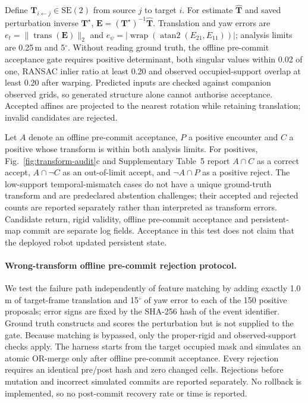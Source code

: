 \documentclass[11pt]{article}
\begin{document}
Define $\mathbf{T}_{i\leftarrow j}\in\mathrm{SE}(2)$ from source $j$ to target $i$. For estimate $\widehat{\mathbf T}$ and saved perturbation inverse $\mathbf T^{\star}$, $\mathbf E=(\mathbf T^{\star})^{-1}\widehat{\mathbf T}$. Translation and yaw errors are $e_t=\|\operatorname{trans}(\mathbf E)\|_2$ and $e_{\psi}=|\operatorname{wrap}(\operatorname{atan2}(E_{21},E_{11}))|$; analysis limits are 0.25\,m and 5$^{\circ}$. Without reading ground truth, the offline pre-commit acceptance gate requires positive determinant, both singular values within 0.02 of one, RANSAC inlier ratio at least 0.20 and observed occupied-support overlap at least 0.20 after warping. Predicted inputs are checked against companion observed grids, so generated structure alone cannot authorise acceptance. Accepted affines are projected to the nearest rotation while retaining translation; invalid candidates are rejected.

Let $A$ denote an offline pre-commit acceptance, $P$ a positive encounter and $C$ a positive whose transform is within both analysis limits. For positives, Fig.~\ref{fig:transform-audit}c and Supplementary Table~5 report $A\cap C$ as a correct accept, $A\cap\neg C$ as an out-of-limit accept, and $\neg A\cap P$ as a positive reject. The low-support temporal-mismatch cases do not have a unique ground-truth transform and are predeclared abstention challenges; their accepted and rejected counts are reported separately rather than interpreted as transform errors. Candidate return, rigid validity, offline pre-commit acceptance and persistent-map commit are separate log fields. Acceptance in this test does not claim that the deployed robot updated persistent state.

\paragraph{Wrong-transform offline pre-commit rejection protocol.}\label{app:transform-safety}
We test the failure path independently of feature matching by adding exactly 1.0\,m of target-frame translation and 15$^{\circ}$ of yaw error to each of the 150 positive proposals; error signs are fixed by the SHA-256 hash of the event identifier. Ground truth constructs and scores the perturbation but is not supplied to the gate. Because matching is bypassed, only the proper-rigid and observed-support checks apply. The harness starts from the target occupied mask and simulates an atomic OR-merge only after offline pre-commit acceptance. Every rejection requires an identical pre/post hash and zero changed cells. Rejections before mutation and incorrect simulated commits are reported separately. No rollback is implemented, so no post-commit recovery rate or time is reported.
\end{document}
